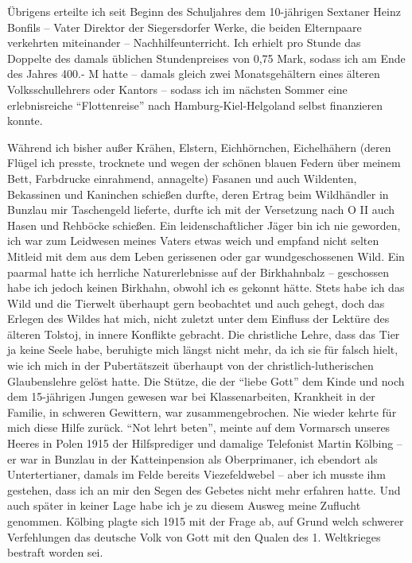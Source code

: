 \documentclass[a5paper,pagesize,10pt,twoside=true]{scrbook}
\begin{document}
Übrigens erteilte ich seit Beginn des Schuljahres dem 10-jährigen Sextaner Heinz Bonfils -- Vater Direktor der Siegersdorfer Werke, die beiden Elternpaare verkehrten miteinander -- Nachhilfeunterricht. Ich erhielt pro Stunde das Doppelte des damals üblichen Stundenpreises von 0,75 Mark, sodass ich am Ende des Jahres 400.- M hatte -- damals gleich zwei Monatsgehältern eines älteren Volksschullehrers oder Kantors -- sodass ich im nächsten Sommer eine erlebnisreiche \enquote{Flottenreise} nach Hamburg-Kiel-Helgoland selbst finanzieren konnte.

Während ich bisher außer Krähen, Elstern, Eichhörnchen, Eichelhähern (deren Flügel ich presste, trocknete und wegen der schönen blauen Federn über meinem Bett, Farbdrucke einrahmend, annagelte) Fasanen und auch Wildenten, Bekassinen und Kaninchen schießen durfte, deren Ertrag beim Wildhändler in Bunzlau mir Taschengeld lieferte, durfte ich mit der Versetzung nach O II auch Hasen und Rehböcke schießen. Ein leidenschaftlicher Jäger bin ich nie geworden, ich war zum Leidwesen meines Vaters etwas weich und empfand nicht selten Mitleid mit dem aus dem Leben gerissenen oder gar wundgeschossenen Wild. Ein paarmal hatte ich herrliche Naturerlebnisse auf der Birkhahnbalz -- geschossen habe ich jedoch keinen Birkhahn, obwohl ich es gekonnt hätte. Stets habe ich das Wild und die Tierwelt überhaupt gern beobachtet und auch gehegt, doch das Erlegen des Wildes hat mich, nicht zuletzt unter dem Einfluss der Lektüre des älteren Tolstoj, in innere Konflikte gebracht. Die christliche Lehre, dass das Tier ja keine Seele habe, beruhigte mich längst nicht mehr, da ich sie für falsch hielt, wie ich mich in der Pubertätszeit überhaupt von der christlich-lutherischen Glaubenslehre gelöst hatte. Die Stütze, die der \enquote{liebe Gott} dem Kinde und noch dem 15-jährigen Jungen gewesen war bei Klassenarbeiten, Krankheit in der Familie, in schweren Gewittern, war zusammengebrochen. Nie wieder kehrte für mich diese Hilfe zurück. \enquote{Not lehrt beten}, meinte auf dem Vormarsch unseres Heeres in Polen 1915 der Hilfsprediger und damalige Telefonist Martin Kölbing -- er war in Bunzlau in der Katteinpension als Oberprimaner, ich ebendort als Untertertianer, damals im Felde bereits Viezefeldwebel -- aber ich musste ihm gestehen, dass ich an mir den Segen des Gebetes nicht mehr erfahren hatte. Und auch später in keiner Lage habe ich je zu diesem Ausweg meine Zuflucht genommen. Kölbing plagte sich 1915 mit der Frage ab, auf Grund welch schwerer Verfehlungen das deutsche Volk von Gott mit den Qualen des 1. Weltkrieges bestraft worden sei.
\end{document}
